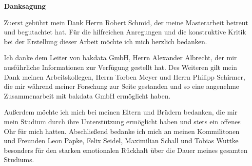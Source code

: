 \vspace*{\fill}
\begin{center}\textsf{\textbf{Danksagung}}\end{center}

\noindent Zuerst gebührt mein Dank Herrn Robert Schmid, der meine Masterarbeit betreut und begutachtet hat. Für die hilfreichen Anregungen und die konstruktive Kritik bei der Erstellung dieser Arbeit möchte ich mich herzlich bedanken.

\noindent Ich danke dem Leiter von bakdata GmbH, Herrn Alexander Albrecht, der mir ausführliche Informationen zur Verfügung gestellt hat. Des Weiteren gilt mein Dank meinen Arbeitskollegen, Herrn Torben Meyer und Herrn Philipp Schirmer, die mir während meiner Forschung zur Seite gestanden und so eine angenehme Zusammenarbeit mit bakdata GmbH ermöglicht haben.

\noindent Außerdem möchte ich mich bei meinen Eltern und Brüdern bedanken, die mir mein Studium durch ihre Unterstützung ermöglicht haben und stets ein offenes Ohr für mich hatten. Abschließend bedanke ich mich an meinen Kommilitonen und Freunden Leon Papke, Felix Seidel, Maximilian Schall und Tobias Wuttke besonders für den starken emotionalen Rückhalt über die Dauer meines gesamten Studiums.

\vspace*{\fill}